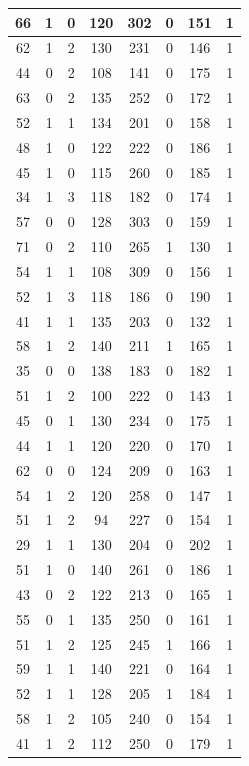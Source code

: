 \documentclass{article}
\begin{document}
\begin{longtable}{|c|c|c|c|c|c|c|c|}
\hline
66 & 1 & 0 & 120 & 302 & 0 & 151 & 1 \\
\hline
62 & 1 & 2 & 130 & 231 & 0 & 146 & 1 \\
\hline
44 & 0 & 2 & 108 & 141 & 0 & 175 & 1 \\
\hline
63 & 0 & 2 & 135 & 252 & 0 & 172 & 1 \\
\hline
52 & 1 & 1 & 134 & 201 & 0 & 158 & 1 \\
\hline
48 & 1 & 0 & 122 & 222 & 0 & 186 & 1 \\
\hline
45 & 1 & 0 & 115 & 260 & 0 & 185 & 1 \\
\hline
34 & 1 & 3 & 118 & 182 & 0 & 174 & 1 \\
\hline
57 & 0 & 0 & 128 & 303 & 0 & 159 & 1 \\
\hline
71 & 0 & 2 & 110 & 265 & 1 & 130 & 1 \\
\hline
54 & 1 & 1 & 108 & 309 & 0 & 156 & 1 \\
\hline
52 & 1 & 3 & 118 & 186 & 0 & 190 & 1 \\
\hline
41 & 1 & 1 & 135 & 203 & 0 & 132 & 1 \\
\hline
58 & 1 & 2 & 140 & 211 & 1 & 165 & 1 \\
\hline
35 & 0 & 0 & 138 & 183 & 0 & 182 & 1 \\
\hline
51 & 1 & 2 & 100 & 222 & 0 & 143 & 1 \\
\hline
45 & 0 & 1 & 130 & 234 & 0 & 175 & 1 \\
\hline
44 & 1 & 1 & 120 & 220 & 0 & 170 & 1 \\
\hline
62 & 0 & 0 & 124 & 209 & 0 & 163 & 1 \\
\hline
54 & 1 & 2 & 120 & 258 & 0 & 147 & 1 \\
\hline
51 & 1 & 2 & 94 & 227 & 0 & 154 & 1 \\
\hline
29 & 1 & 1 & 130 & 204 & 0 & 202 & 1 \\
\hline
51 & 1 & 0 & 140 & 261 & 0 & 186 & 1 \\
\hline
43 & 0 & 2 & 122 & 213 & 0 & 165 & 1 \\
\hline
55 & 0 & 1 & 135 & 250 & 0 & 161 & 1 \\
\hline
51 & 1 & 2 & 125 & 245 & 1 & 166 & 1 \\
\hline
59 & 1 & 1 & 140 & 221 & 0 & 164 & 1 \\
\hline
52 & 1 & 1 & 128 & 205 & 1 & 184 & 1 \\
\hline
58 & 1 & 2 & 105 & 240 & 0 & 154 & 1 \\
\hline
41 & 1 & 2 & 112 & 250 & 0 & 179 & 1 \\

\end{longtable}
\end{document}
